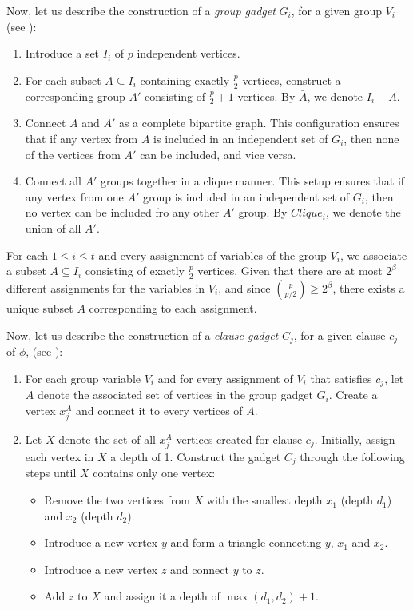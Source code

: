 

Now, let us describe the construction of a \textit{group gadget} $G_i$, for a given group $V_i$ (see ):

\begin{enumerate}
    \item Introduce a set $I_i$ of $p$ independent vertices.
    \item For each subset $A \subseteq I_i$ containing exactly $\frac{p}{2}$ vertices, construct a corresponding group $A'$ consisting of $\frac{p}{2} + 1$ vertices. By $\bar{A}$, we denote $I_i - A$.
    \item Connect $A$ and $A'$ as a complete bipartite graph. This configuration ensures that if any vertex from $A$ is included in an independent set of $G_i$, then none of the vertices from $A'$ can be included, and vice versa.
    \item Connect all $A'$ groups together in a clique manner. This setup ensures that if any vertex from one $A'$ group is included in an independent set of $G_i$, then no vertex can be included fro any other $A'$ group. By $Clique_i$, we denote the union of all $A'$.
\end{enumerate}

\medskip

For each $1 \leq i \leq t$ and every assignment of variables of the group $V_i$, we associate a subset $A \subseteq I_i$ consisting of exactly $\frac{p}{2}$ vertices. Given that there are at most $2^\beta$ different assignments for the variables in $V_i$, and since $\binom{p}{p/2} \geq 2^\beta$, there exists a unique subset $A$ corresponding to each assignment.

\medskip

Now, let us describe the construction of a \textit{clause gadget} $C_j$, for a given clause $c_j$ of $\phi$, (see ):
\begin{enumerate}
    \item For each group variable $V_i$ and for every assignment of $V_i$ that satisfies $c_j$, let $A$ denote the associated set of vertices in the group gadget $G_i$. Create a vertex $x_j^A$ and connect it to every vertices of $A$.
    \item Let $X$ denote the set of all $x_j^A$ vertices created for clause $c_j$. Initially, assign each vertex in $X$ a depth of 1. Construct the gadget $C_j$ through the following steps until $X$ contains only one vertex:
    \begin{itemize}
        \item Remove the two vertices from $X$ with the smallest depth $x_1$ (depth $d_1$) and $x_2$ (depth $d_2$).
        \item Introduce a new vertex $y$ and form a triangle connecting $y$, $x_1$ and $x_2$.
        \item Introduce a new vertex $z$ and connect $y$ to $z$.
        \item Add $z$ to $X$ and assign it a depth of $\max(d_1, d_2) + 1$. 
    \end{itemize}
\end{enumerate}

